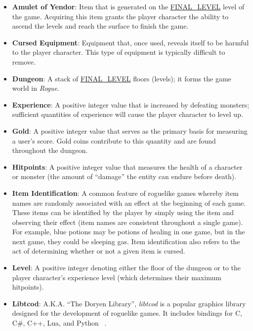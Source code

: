 \documentclass[12pt, titlepage]{article}
\begin{document}
	\begin{itemize}
		\item \textbf{Amulet of Yendor}: Item that is generated on the \hyperref[symbolicParameters]{FINAL\_LEVEL} level of the game.  Acquiring this item grants the player character the ability to ascend the levels and reach the surface to finish the game.

		\item \textbf{Cursed Equipment}: Equipment that, once used, reveals itself to be harmful to the player character.  This type of equipment is typically difficult to remove.

		\item \textbf{Dungeon}: A stack of \hyperref[symbolicParameters]{FINAL\_LEVEL} floors (levels); it forms the game world in \textit{Rogue}.

		\item \textbf{Experience}: A positive integer value that is increased by defeating monsters; sufficient quantities of experience will cause the player character to level up.

		\item \textbf{Gold}: A positive integer value that serves as the primary basis for measuring a user's score.  Gold coins contribute to this quantity and are found throughout the dungeon.

		\item \textbf{Hitpoints}: A positive integer value that measures the health of a character or monster (the amount of ``damage'' the entity can endure before death).

		\item \textbf{Item Identification}: A common feature of roguelike games whereby item names are randomly associated with an effect at the beginning of each game.  These items can be identified by the player by simply using the item and observing their effect (item names are consistent throughout a single game).  For example, blue potions may be potions of healing in one game, but in the next game, they could be sleeping gas.  Item identification also refers to the act of determining whether or not a given item is cursed.

		\item \textbf{Level}: A positive integer denoting either the floor of the dungeon or to the player character's experience level (which determines their maximum hitpoints).

		\item \textbf{Libtcod}: A.K.A. ``The Doryen Library'', \textit{libtcod} is a popular graphics library designed for the development of roguelike games.  It includes bindings for C, C\#, C++, Lua, and Python ~\citep{LibtcodHome}.


\end{itemize}
\end{document}
